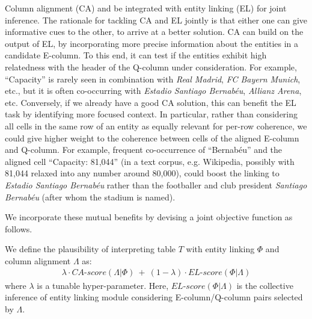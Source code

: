 %
Column alignment (CA) and be integrated with entity linking (EL) for joint inference.
The rationale for tackling CA and EL jointly
is that either one can give informative cues to the other, to
arrive at a better solution.
CA can build on the output of EL, by 
incorporating more precise information about
the entities in a candidate E-column.
To this end, it can test if the entities 
exhibit high relatedness with the header of the
Q-column under consideration.
For example, ``Capacity'' is rarely seen
in combination with {\it Real Madrid},
{\it FC Bayern Munich}, etc.,
but it is often co-occurring with
{\it Estadio Santiago Bernab\'{e}u},
{\it Allianz Arena}, etc.
Conversely, if we already have
a good CA solution, this can
benefit the EL task by identifying
more focused context. 
In particular, rather than
considering all cells in the same
row of an entity as equally
relevant for per-row coherence,
we could give higher weight
to the coherence between
cells of the aligned E-column
and Q-column.
For example, frequent co-occurrence
of ``Bernab\'{e}u'' and the
aligned cell ``Capacity: 81,044''
(in a text corpus, e.g. Wikipedia,
possibly with 81,044 relaxed
into any number around 80,000),
could boost the linking to
{\it Estadio Santiago Bernab\'{e}u}
rather than the footballer and 
club president
{\it Santiago Bernab\'{e}u}
(after whom the stadium is named).

We incorporate these mutual benefits
by devising a joint objective function
as follows.

\vspace{0.1cm}
%
We define the plausibility of
interpreting table $T$ with 
entity 
linking
$\Phi$ and
column alignment $\Lambda$ as:
\begin{align}
\label{eq:joint}
\lambda \cdot \textit{CA-score}(\Lambda | \Phi) ~ + ~ 
(1-\lambda) \cdot \textit{EL-score}(\Phi | \Lambda)
\end{align}
where $\lambda$ is a tunable hyper-parameter. Here, $\textit{EL-score}(\Phi | \Lambda)$ is the collective inference of entity linking module considering E-column/Q-column
pairs selected by $\Lambda$. 

